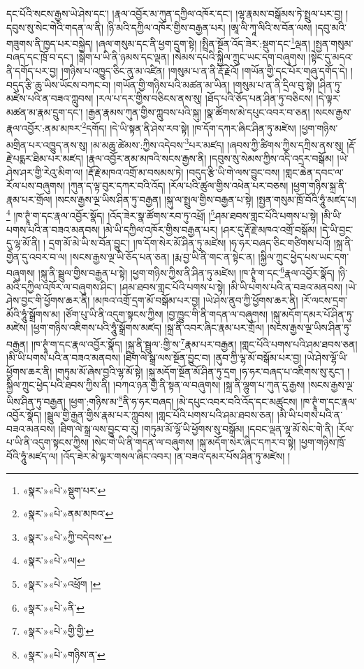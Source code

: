 དང་པོའི་སངས་རྒྱས་ཡེ་ཤེས་དང་། །རྣལ་འབྱོར་མ་ཀུན་དཀྱིལ་འཁོར་དང་། །ལྷ་རྣམས་བསྒོམས་ཏེ་སྤྲུལ་པར་བྱ། །དབུས་སུ་སེང་གེའི་གདན་ལ་ནི། །ཉི་མའི་དཀྱིལ་འཁོར་གྱིས་བརྒྱན་པར། །ཨཱ་ལི་ཀཱ་ལིའི་ས་བོན་ལས། །དབུ་མའི་གཟུགས་ནི་ཁྱད་པར་བསྐྱེད། །ཞལ་གསུམ་དང་ནི་ཕྱག་དྲུག་སྟེ། །སྤྲིན་སྔོན་འོད་ཟེར་:སྡུག་དང་\footnote{«སྣར་»«པེ་»སྡུག་པར་}ལྡན། །སྤྱན་གསུམ་བཞད་དང་ཁྲོ་བ་དང་། །སྒེག་པ་ཡི་ནི་ཉམས་དང་ལྡན། །སེམས་དཔའི་སྐྱིལ་ཀྲུང་ཡང་དག་བཞུགས། །སྟེང་དུ་མདའ་ནི་དགོད་པར་བྱ། །གཉིས་པ་འཁྱུད་ཅིང་ནུ་མ་འཛིན། །གསུམ་པ་ན་ནི་རྡོ་རྗེའོ། །གཡོན་གྱི་དང་པོར་གཞུ་དགོད་དེ། །བདུད་རྩི་ཆུ་ཡིས་ཡོངས་བཀང་བ། །གཡོན་གྱི་གཉིས་པའི་མཚན་མ་ཡིན། །གསུམ་པ་ན་ནི་དྲིལ་བུ་སྟེ། །ཤིན་ཏུ་མཛེས་པའི་ན་བཟའ་ཀླུབས། །རལ་པ་དར་གྱིས་བཅིངས་ནས་སུ། །ཐོད་པའི་ཅོད་པན་ཤིན་ཏུ་བཅིངས། །དེ་ལྟར་མཚན་མ་རྣམ་དྲུག་དང་། །རྒྱན་རྣམས་ཀུན་གྱིས་ཀླུབས་པའི་སྐུ། །སྣ་ཚོགས་མེ་དཔུང་འབར་བ་ཅན། །སངས་རྒྱས་རྣལ་འབྱོར་:ནམ་མཁར་\footnote{«སྣར་»«པེ་»ནམ་མཁའ་}དགོད། །དེ་ཡི་སྟན་ནི་ཤེས་རབ་སྟེ། །ཁ་དོག་དཀར་ཞིང་ཤིན་ཏུ་མཛེས། །ཕྱག་གཉིས་མགྲིན་པར་འཁྱུད་ནས་སུ། །མ་མཆུ་ཚེམས་:ཀྱིས་འདེབས་\footnote{«སྣར་»«པེ་»ཀྱི་བདེབས་}པར་མཛད། །ཞབས་ཀྱི་ཚིགས་ཀྱིས་དཀྲིས་ནས་སུ། །རྡོ་རྗེ་པདྨར་ཐིམ་པར་མཛད། །རྣལ་འབྱོར་ནམ་མཁའི་སངས་རྒྱས་ནི། །དབུས་སུ་སེམས་ཀྱིས་འདི་འདྲར་བསྒོམ། །ཡེ་ཤེས་ཤར་གྱི་རེའུ་མིག་ལ། །རྡོ་རྗེ་མཁའ་འགྲོ་མ་བསམས་ཏེ། །བདུད་རྩི་ཡི་གེ་ལས་བྱུང་བས། །གླང་ཆེན་དབང་ལ་རོལ་པས་བཞུགས། །ཀུན་ད་ལྟ་བུར་དཀར་བའི་འོད། །རོལ་པའི་ཚུལ་གྱིས་འཕེན་པར་བཅས། །ཕྱག་གཉིས་སྐྲ་ནི་རྣམ་པར་གྲོལ། །སངས་རྒྱས་ལྔ་ཡིས་ཤིན་ཏུ་བརྒྱན། །སྐུ་ལ་སྤྲུལ་གྱིས་བརྒྱན་པ་སྟེ། །སྤྱན་གསུམ་ཁྲོ་བོའི་ཧཱུཾ་མཛད་པ།\footnote{«སྣར་»«པེ་»ལ།} །ཁ་ཊྭཱཾ་ག་དང་རྣལ་འབྱོར་སྣོད། །འོད་ཟེར་སྣ་ཚོགས་རབ་ཏུ་འཕྲོ། །\footnote{«སྣར་»«པེ་»འཕྲོག །}ཤམ་ཐབས་གླང་པོའི་པགས་པ་སྟེ། །མི་ཡི་པགས་པའི་ན་བཟའ་མནབས། །མེ་ཡི་དཀྱིལ་འཁོར་གྱིས་བརྒྱན་པར། །ཤར་དུ་རྡོ་རྗེ་མཁའ་འགྲོ་བསྒོམ། །དེ་ཡི་བྱང་དུ་ལྷ་མོ་ནི། །
དྲག་མོ་མེ་ཡི་ས་བོན་བྱུང་། །ཁ་དོག་སེར་མོ་ཤིན་ཏུ་མཛེས། །ཧ་ཧར་བཞད་ཅིང་གཙིགས་པའོ། །སྐྲ་ནི་གྱེན་དུ་འབར་བ་ལ། །སངས་རྒྱས་ལྔ་ཡི་ཅོད་པན་ཅན། །རྨ་བྱ་ཡི་ནི་གང་ན་སྟེང་ན། །སྐྱིལ་ཀྲུང་ཕྱེད་པས་ཡང་དག་བཞུགས། །སྐུ་ནི་སྦྲུལ་གྱིས་བརྒྱན་པ་སྟེ། །ཕྱག་གཉིས་ཀྱིས་ནི་ཤིན་ཏུ་མཛེས། །ཁ་ཊྭཱཾ་ག་དང་\footnote{«སྣར་»«པེ་»ནི་}རྣལ་འབྱོར་སྣོད། །ཉི་མའི་དཀྱིལ་འཁོར་ལ་བཞུགས་ཤིང་། །ཤམ་ཐབས་གླང་པོའི་པགས་པ་སྟེ། །མི་ཡི་པགས་པའི་ན་བཟའ་མནབས། །ཡེ་ཤེས་བྱང་གི་ཕྱོགས་ཆར་ནི། །མཁའ་འགྲོ་དྲག་མོ་བསྒོམ་པར་བྱ། །ཡེ་ཤེས་ནུབ་ཀྱི་ཕྱོགས་ཆར་ནི། །རོ་ལངས་དྲག་མོའི་ཧཱུཾ་སྒྲོགས་མ། །ཙོག་པུ་ཡི་ནི་འདུག་སྟངས་ཀྱིས། །བྱ་ཁྱུང་གི་ནི་གདན་ལ་བཞུགས། །སྐུ་མདོག་དམར་པོ་ཤིན་ཏུ་མཛེས། །ཕྱག་གཉིས་འཇིགས་པའི་ཧཱུཾ་སྒྲོགས་མཛད། །སྐྲ་ནི་འབར་ཞིང་རྣམ་པར་གྲོལ། །སངས་རྒྱས་ལྔ་ཡིས་ཤིན་ཏུ་བརྒྱན། །ཁ་ཊྭཱཾ་ག་དང་རྣལ་འབྱོར་སྣོད། །སྐུ་ནི་སྦྲུལ་:གྱི་ས་\footnote{«སྣར་»«པེ་»གྱི་གྱི་}རྣམ་པར་བརྒྱན། །གླང་པོའི་པགས་པའི་ཤམ་ཐབས་ཅན། །མི་ཡི་པགས་པའི་ན་བཟའ་མནབས། །ཐིག་ལེ་སྒྲ་ལས་སྔོན་བྱུང་བ། །ནུབ་ཀྱི་ལྷ་མོ་བསྒོམ་པར་བྱ། །ཡེ་ཤེས་ལྷོ་ཡི་ཕྱོགས་ཆར་ནི། །གཏུམ་མོ་ཞེས་བྱའི་ལྷ་མོ་སྟེ། །སྐུ་མདོག་སྔོན་མོ་ཤིན་ཏུ་དྲག །ཧ་ཧར་བཞད་པ་འཇིགས་སུ་རུང་། །སྐྱིལ་ཀྲུང་ཕྱེད་པའི་ཐབས་ཀྱིས་ནི། །བཀའ་ཉན་གྱི་ནི་སྟན་ལ་བཞུགས། །སྐྲ་ནི་ལྷུག་པ་ཀུན་དུ་རྒྱས། །སངས་རྒྱས་ལྔ་ཡིས་ཤིན་ཏུ་བརྒྱན། །ཕྱག་:གཉིས་མ་\footnote{«སྣར་»«པེ་»གཉིས་ན་}ནི་ཧ་ཧར་བཞད། །མེ་དཔུང་འབར་བའི་འོད་དང་མཚུངས། །ཁ་ཊྭཱཾ་ག་དང་རྣལ་འབྱོར་སྣོད། །སྦྲུལ་གྱི་རྒྱན་གྱིས་རྣམ་པར་ཀླུབས། །གླང་པོའི་པགས་པའི་ཤམ་ཐབས་ཅན། །མི་ཡི་པགས་པའི་ན་བཟའ་མནབས། །ཐིག་ལེ་སྒྲ་ལས་བྱུང་བ་རུ། །གཏུམ་མོ་ལྷོ་ཡི་ཕྱོགས་སུ་བསྒོམ། །དབང་ལྡན་ལྷ་མོ་སེང་གེ་ནི། །རོལ་པ་ཡི་ནི་འདུག་སྟངས་ཀྱིས། །སེང་གེ་ཡི་ནི་གདན་ལ་བཞུགས། །སྐུ་མདོག་སེར་ཞིང་དཀར་བ་སྟེ། །ཕྱག་གཉིས་ཁྲོ་བོའི་ཧཱུཾ་མཛད་ལ། །འོད་ཟེར་མེ་ལྟར་གསལ་ཞིང་འབར། །ན་བཟའ་དམར་པོས་ཤིན་ཏུ་མཛེས། །
